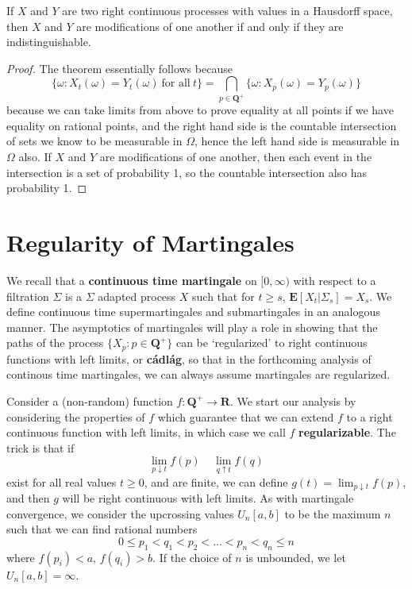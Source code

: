 \begin{theorem}
    If $X$ and $Y$ are two right continuous processes with values in a Hausdorff space, then $X$ and $Y$ are modifications of one another if and only if they are indistinguishable.
\end{theorem}
\begin{proof}
    The theorem essentially follows because
    \[ \{ \omega:  X_t(\omega) = Y_t(\omega)\ \text{for all}\ t \} = \bigcap_{p \in \mathbf{Q}^+} \{ \omega: X_p(\omega) = Y_p(\omega) \} \]
    because we can take limits from above to prove equality at all points if we have equality on rational points, and the right hand side is the countable intersection of sets we know to be measurable in $\Omega$, hence the left hand side is measurable in $\Omega$ also. If $X$ and $Y$ are modifications of one another, then each event in the intersection is a set of probability 1, so the countable intersection also has probability 1.
\end{proof}

\section{Regularity of Martingales}

We recall that a {\bf continuous time martingale} on $[0,\infty)$ with respect to a filtration $\Sigma$ is a $\Sigma$ adapted process $X$ such that for $t \geq s$, $\mathbf{E}[X_t|\Sigma_s] = X_s$. We define continuous time supermartingales and submartingales in an analogous manner. The asymptotics of martingales will play a role in showing that the paths of the process $\{ X_p: p \in \mathbf{Q}^+ \}$ can be `regularized' to right continuous functions with left limits, or {\bf c\'{a}dl\'{a}g}, so that in the forthcoming analysis of continous time martingales, we can always assume martingales are regularized.

Consider a (non-random) function $f: \mathbf{Q}^+ \to \mathbf{R}$. We start our analysis by considering the properties of $f$ which guarantee that we can extend $f$ to a right continuous function with left limits, in which case we call $f$ {\bf regularizable}. The trick is that if
%
\[ \lim_{p \downarrow t} f(p)\ \ \ \ \ \lim_{q \uparrow t} f(q) \]
%
exist for all real values $t \geq 0$, and are finite, we can define $g(t) = \lim_{p \downarrow t} f(p)$, and then $g$ will be right continuous with left limits. As with martingale convergence, we consider the upcrossing values $U_n[a,b]$ to be the maximum $n$ such that we can find rational numbers
%
\[ 0 \leq p_1 < q_1 < p_2 < \dots < p_n < q_n \leq n \]
%
where $f(p_i) < a$, $f(q_i) > b$. If the choice of $n$ is unbounded, we let $U_n[a,b] = \infty$.


